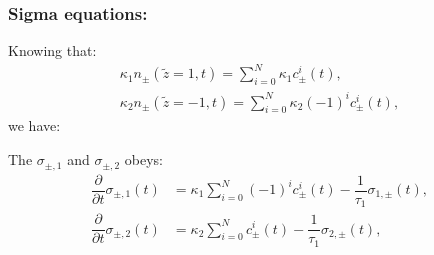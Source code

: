 \documentclass[amsmath,amsfonts,amssymb,superscriptaddress,showkeys,notitlepage,onecolumn]{revtex4-1}
\begin{document}
\subsubsection{Sigma equations:}

Knowing that:
\begin{align}
  \kappa_1 n_{\pm}(\tilde{z}=1,t)=\sum_{i=0}^N\kappa_1 c_{\pm}^i(t),\\
  \kappa_2 n_{\pm}(\tilde{z}=-1,t)=\sum_{i=0}^N\kappa_2 (-1)^{i} c_{\pm}^i(t),
\end{align}
we have:

The $\sigma_{\pm,1}$ and $\sigma_{\pm,2}$ obeys:
\begin{align}\nonumber
  \dfrac{\partial}{\partial t} \sigma_{\pm,1}(t)&=\kappa_1 \sum^{N}_{i=0} (-1)^i c^i_{\pm}(t)-\dfrac{1}{\tau_1} \sigma_{1,\pm}(t),\\
  \dfrac{\partial}{\partial t} \sigma_{\pm,2}(t)&=\kappa_2 \sum^{N}_{i=0}  c^i_{\pm}(t)-\dfrac{1}{\tau_1} \sigma_{2,\pm}(t),
\end{align}
\end{document}
